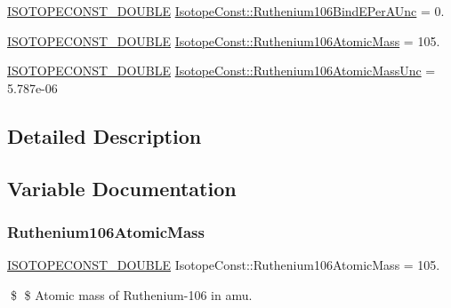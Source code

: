 \begin{DoxyCompactItemize}
\mbox{\hyperlink{group___isotope_const-_macros_ga8f45a7272ce02c0b4c65c44636ed719a}{I\+S\+O\+T\+O\+P\+E\+C\+O\+N\+S\+T\+\_\+\+D\+O\+U\+B\+LE}} \mbox{\hyperlink{group___isotope_const-_ruthenium-_ru106_ga7899acf91828d589bd3acc96fb0c3e14}{Isotope\+Const\+::\+Ruthenium106\+Bind\+E\+Per\+A\+Unc}} = 0.
\item 
\mbox{\hyperlink{group___isotope_const-_macros_ga8f45a7272ce02c0b4c65c44636ed719a}{I\+S\+O\+T\+O\+P\+E\+C\+O\+N\+S\+T\+\_\+\+D\+O\+U\+B\+LE}} \mbox{\hyperlink{group___isotope_const-_ruthenium-_ru106_ga8e3b1f2120d044c0f9691259c5a3ce8b}{Isotope\+Const\+::\+Ruthenium106\+Atomic\+Mass}} = 105.
\item 
\mbox{\hyperlink{group___isotope_const-_macros_ga8f45a7272ce02c0b4c65c44636ed719a}{I\+S\+O\+T\+O\+P\+E\+C\+O\+N\+S\+T\+\_\+\+D\+O\+U\+B\+LE}} \mbox{\hyperlink{group___isotope_const-_ruthenium-_ru106_gac7736b3f56f220f93727dd4103d979fb}{Isotope\+Const\+::\+Ruthenium106\+Atomic\+Mass\+Unc}} = 5.\+787e-\/06
\end{DoxyCompactItemize}


\subsection{Detailed Description}


\subsection{Variable Documentation}
\mbox{\label{group___isotope_const-_ruthenium-_ru106_ga8e3b1f2120d044c0f9691259c5a3ce8b}} 
\subsubsection{\texorpdfstring{Ruthenium106\+Atomic\+Mass}{Ruthenium106AtomicMass}}
{\footnotesize\ttfamily \mbox{\hyperlink{group___isotope_const-_macros_ga8f45a7272ce02c0b4c65c44636ed719a}{I\+S\+O\+T\+O\+P\+E\+C\+O\+N\+S\+T\+\_\+\+D\+O\+U\+B\+LE}} Isotope\+Const\+::\+Ruthenium106\+Atomic\+Mass = 105.}

\$ \$ Atomic mass of Ruthenium-\/106 in amu. \mbox{\label{group___isotope_const-_ruthenium-_ru106_gac7736b3f56f220f93727dd4103d979fb}} 
